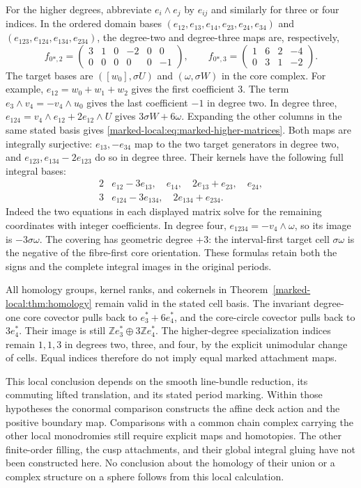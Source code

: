 For the higher degrees, abbreviate $e_i\wedge e_j$ by $e_{ij}$
and similarly for three or four indices. In the ordered domain
bases $(e_{12},e_{13},e_{14},e_{23},e_{24},e_{34})$ and
$(e_{123},e_{124},e_{134},e_{234})$, the degree-two and
degree-three maps are, respectively,
\begin{equation}\label{marked-local:eq:marked-higher-matrices}
 f_{0*,2}=\begin{pmatrix}3&1&0&-2&0&0\\0&0&0&0&0&-1\end{pmatrix},
 \qquad
 f_{0*,3}=\begin{pmatrix}1&6&2&-4\\0&3&1&-2\end{pmatrix}.
\end{equation}
The target bases are $([w_0],\sigma U)$ and
$(\omega,\sigma W)$ in the core complex. For example,
$e_{12}=w_0+w_1+w_2$ gives the first coefficient $3$.
The term $e_3\wedge v_4=-v_4\wedge u_0$ gives the last
coefficient $-1$ in degree two. In degree three,
$e_{124}=v_4\wedge e_{12}+2e_{12}\wedge U$
gives $3\sigma W+6\omega$. Expanding the other columns
in the same stated basis gives \eqref{marked-local:eq:marked-higher-matrices}.
Both maps are integrally surjective: $e_{13},-e_{34}$ map to
the two target generators in degree two, and
$e_{123},e_{134}-2e_{123}$ do so in degree three.
Their kernels have the following full integral bases:
\[
 \begin{array}{c|l}
 2&e_{12}-3e_{13},\quad e_{14},\quad 2e_{13}+e_{23},\quad e_{24},\\
 3&e_{124}-3e_{134},\quad 2e_{134}+e_{234}.
 \end{array}
\]
Indeed the two equations in each displayed matrix solve for the
remaining coordinates with integer coefficients. In degree four,
$e_{1234}=-v_4\wedge\omega$, so its image is $-3\sigma\omega$.
The covering has geometric degree $+3$: the interval-first target
cell $\sigma\omega$ is the negative of the fibre-first core
orientation. These formulas retain both the signs and the complete
integral images in the original periods.

All homology groups, kernel ranks, and cokernels in
Theorem~\ref{marked-local:thm:homology} remain valid in the stated cell basis.
The invariant degree-one core covector pulls back to
$e_3^*+6e_4^*$, and the core-circle covector pulls back to
$3e_4^*$. Their image is still
$\mathbb Ze_3^*\oplus3\mathbb Ze_4^*$. The higher-degree
specialization indices remain $1,1,3$ in degrees two, three,
and four, by the explicit unimodular change of cells.
Equal indices therefore do not imply equal marked attachment maps.

This local conclusion depends on the smooth line-bundle reduction,
its commuting lifted translation, and its stated period marking.
Within those hypotheses the conormal comparison constructs the
affine deck action and the positive boundary map. Comparisons with
a common chain complex carrying the other local monodromies still
require explicit maps and homotopies. The other finite-order filling,
the cusp attachments, and their global integral gluing have not been
constructed here. No conclusion about the homology of their union
or a complex structure on a sphere follows from this local calculation.

